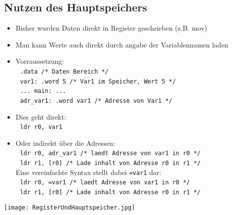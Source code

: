 	\subsection{Nutzen des Hauptspeichers}
		\begin{itemize}
			\item Bisher wurden Daten direkt in Register geschrieben (z.B. mov)
			\item Man kann Werte auch direkt durch angabe der Variablennamen laden
			\item Vorraussetzung: \\
				\textcolor{white}{.} \hspace{0.5cm} \texttt{.data /* Daten Bereich */} \\
				\textcolor{white}{.} \hspace{0.5cm} \texttt{var1: .word 5 /* Var1 im Speicher, Wert 5 */} \\
				\textcolor{white}{.} \hspace{0.5cm} \texttt{... main: ...} \\
				\textcolor{white}{.} \hspace{0.5cm} \texttt{adr\_var1: .word var1 /* Adresse von Var1 */}
			\item Dies geht direkt: \\ 
				\textcolor{white}{.} \hspace{0.5cm} \texttt{ldr r0, var1}
			\item Oder indirekt über die Adressen:\\ 
					\textcolor{white}{.} \hspace{0.5cm} \texttt{ldr r0, adr\_var1 /* laedt Adresse von var1 in r0 */} \\ \vspace{0.15cm}
					\textcolor{white}{.} \hspace{0.5cm} \texttt{ldr r1, [r0] /* Lade inhalt von Adresse r0 in r1 */} \\
				Eine vereinfachte Syntax stellt dabei \texttt{=var1} dar: \\
					\textcolor{white}{.} \hspace{0.5cm} \texttt{ldr r0, =var1 /* laedt Adresse von var1 in r0 */} \\
					\textcolor{white}{.} \hspace{0.5cm} \texttt{ldr r1, [r0] /* Lade inhalt von Adresse r0 in r1 */} \\
		\end{itemize}
		\begin{center}
			\texttt{[image: RegisterUndHauptspeicher.jpg]}
		\end{center}


